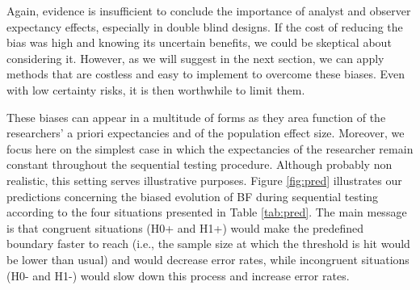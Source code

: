 \documentclass[a4paper,man,natbib,floatsintext,donotrepeattitle]{apa6}
\begin{document}
\begin{table}[H]
\centering
\caption{Possible interactions between population effect size and a priori beliefs during a sequential testing procedure. Congruent observations are expected to increase the speed with which the of threshold is reached (H0+ and H1+), while incongruent observations are expected to slow down the process (H0- and H1-), and to increase the number of false alarms.}
\label{tab:pred}
\end{table}

Again, evidence is insufficient to conclude the importance of analyst and observer expectancy effects, especially in double blind designs. If the cost of reducing the bias was high and knowing its uncertain benefits, we could be skeptical about considering it. However, as we will suggest in the next section, we can apply methods that are costless and easy to implement to overcome these biases. Even with low certainty risks, it is then worthwhile to limit them.

These biases can appear in a multitude of forms as they area function of the researchers' a priori expectancies and of the population effect size. Moreover, we focus here on the simplest case in which the expectancies of the researcher remain constant throughout the sequential testing procedure. Although probably non realistic, this setting serves illustrative purposes. Figure \ref{fig:pred} illustrates our predictions concerning the biased evolution of BF during sequential testing according to the four situations presented in Table \ref{tab:pred}. The main message is that congruent situations (H0+ and H1+) would make the predefined boundary faster to reach (i.e., the sample size at which the threshold is hit would be lower than usual) and would decrease error rates, while incongruent situations (H0- and H1-) would slow down this process and increase error rates.
\end{document}
